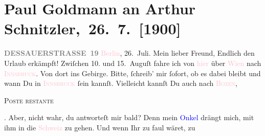 

         
         \renewcommand{\erwaehntePersonen}{Personen: Alfred Kerr, Fedor Mamroth}
         \renewcommand{\erwaehnteOrte}{Orte: Bad Aussee, Berlin, Bozen, Dessauer Straße, Innsbruck, Schweiz, Wien}
         \renewcommand{\erwaehnteWerke}{}
               \section[ Paul Goldmann an Arthur Schnitzler, 26. 7. {[}1900{]}]{Paul Goldmann an Arthur Schnitzler, 26. 7. {[}1900{]}}\nopagebreak{}\rehead{ }\normalsize\beginnumbering{} \toendnotes[C]{\smallbreak\pagebreak[2]} 
\toendnotes[C]{\smallbreak}\pstart
           \noindent{}\raggedleft{}{\pb}\textcolor{pink}{\textcolor{gray}{\textbf{DESSAUERSTRASSE 19}}}{}\ledrightnote{\textcolor{pink}{Dessauer Straße}}\pend
           \pstart
           \textcolor{pink}{Berlin}{}\ledrightnote{\textcolor{pink}{Berlin}}, 26. Juli.\pend
           \pstart\center{}Mein lieber Freund,\pend\pstart
           Endlich den Urlaub erkämpft! Zwiſchen 10. und 15. Auguſt fahre ich von \textcolor{pink}{hier}{}\ledrightnote{{$\rightarrow$}\textcolor{pink}{Berlin}} über \textcolor{pink}{Wien}{}\ledrightnote{\textcolor{pink}{Wien}} nach \textsc{\textcolor{pink}{Innsbruck}{}\ledrightnote{\textcolor{pink}{Innsbruck}}}. Von dort \label{K_L02925-1v}\label{K_L02925-1h} ins Gebirge. Bitte, ſchreib’ mir ſofort, ob es dabei bleibt und wann Du in
                  \textsc{\textcolor{pink}{Innsbruck}{}\ledrightnote{\textcolor{pink}{Innsbruck}}} ſein kannſt. Vielleicht kannſt {\pb}Du auch
                  \label{K_L02925-2v}\label{K_L02925-2h} nach \textsc{\textcolor{pink}{Bozen}{}\ledrightnote{\textcolor{pink}{Bozen}}}, \begin{otherlanguage}{french}\textsc{Poste restante}\end{otherlanguage}. Aber, nicht wahr, du antworteſt mir bald? Denn mein \textcolor{blue}{Onkel}{}\ledrightnote{{$\rightarrow$}\textcolor{blue}{Fedor Mamroth}} drängt mich, mit ihm in die \textcolor{pink}{Schweiz}{}\ledrightnote{\textcolor{pink}{Schweiz}} zu gehen. Und wenn Ihr zu faul wäret, zu
